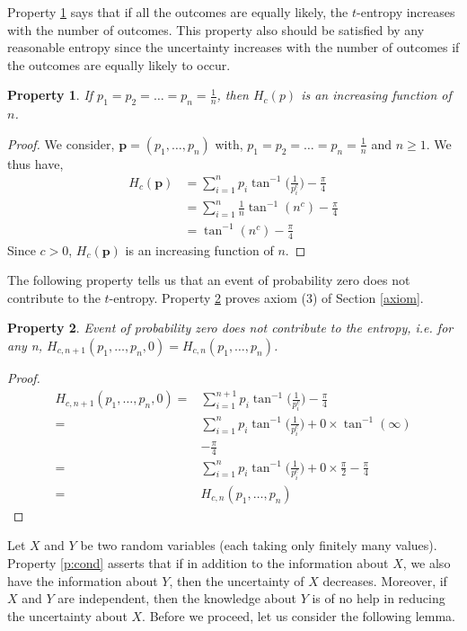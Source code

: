 \documentclass{article}
\newcommand{\bp}{\boldsymbol{p}}
\newtheorem{prop}{Property}
\begin{document}
Property \ref{p:5} says that if all the outcomes are equally likely, the $t$-entropy increases with the number of outcomes. This property also should be satisfied by any reasonable entropy since the uncertainty increases with the number of outcomes if the outcomes are equally likely to occur.

\begin{prop}
\label{p:5}
If $p_1=p_2=\dots=p_n=\frac{1}{n}$, then $H_c(p)$ is an increasing function of $n$.
\end{prop}
\begin{proof}
We consider, $\bp=(p_1,\dots,p_n)$ with, $p_1=p_2=\dots=p_n=\frac{1}{n}$ and $n \geq 1$. We thus have, 
\begin{align*}
    H_c(\bp) & =\sum_{i=1}^{n} p_i \tan^{-1}\bigg(\frac{1}{p_i^c}\bigg) - \frac{\pi}{4}\\
    & = \sum_{i=1}^{n} \frac{1}{n} \tan^{-1}(n^c) - \frac{\pi}{4}\\
    & = \tan^{-1}(n^c) - \frac{\pi}{4}
\end{align*}
Since $c>0$, $H_c(\bp)$ is an increasing function of $n$.
\end{proof}

The following property tells us that an event of probability zero does not contribute to the $t$-entropy. Property \ref{pa3} proves axiom (3) of Section \ref{axiom}.

\begin{prop}
\label{pa3}
 Event of probability zero does not contribute to the entropy, i.e. for any n, $H_{c,n+1}(p_1,\dots,p_n,0)=H_{c,n}(p_1,\dots,p_n)$.
\end{prop}

\begin{proof}
\begin{align*}
H_{c,n+1}(p_1,\dots,p_n,0)  = & \sum_{i=1}^{n+1} p_i \tan^{-1}\bigg(\frac{1}{p_i^c}\bigg) - \frac{\pi}{4}\\
 = &\sum_{i=1}^n p_i \tan^{-1}\bigg(\frac{1}{p_i^c}\bigg)+0 \times \tan^{-1}(\infty)\\
& - \frac{\pi}{4}\\
 = & \sum_{i=1}^n p_i \tan^{-1}\bigg(\frac{1}{p_i^c}\bigg)+0 \times \frac{\pi}{2} - \frac{\pi}{4}\\
 = & H_{c,n}(p_1,\dots,p_n)    
\end{align*}
\end{proof}

Let $X$ and $Y$ be two random variables (each taking only finitely many values).
Property \ref{p:cond} asserts that if in addition to the information about $X$, we also have the information about $Y$, then the uncertainty of $X$ decreases. Moreover, if $X$ and $Y$ are independent, then the knowledge about $Y$ is of no help in reducing the uncertainty about $X$.  Before we proceed, let us consider the following lemma.  
\end{document}
